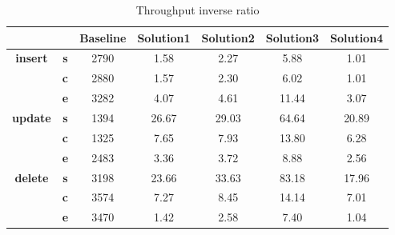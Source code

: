 \begin{table}[h]
\centering
\caption{Throughput inverse ratio}\label{t:}
\begin{tabular}{ccccccc}
\toprule
&&\textbf{Baseline} & \textbf{Solution1} & \textbf{Solution2} & \textbf{Solution3} & \textbf{Solution4}\\
\midrule
\multirow{3}{*}{\textbf{insert}} & \textbf{s} & 2790 & 1.58 & 2.27 & 5.88 & 1.01\\
 & \textbf{c} & 2880 & 1.57 & 2.30 & 6.02 & 1.01\\
 & \textbf{e} & 3282 & 4.07 & 4.61 & 11.44 & 3.07\\
\midrule
\multirow{3}{*}{\textbf{update}} & \textbf{s} & 1394 & 26.67 & 29.03 & 64.64 & 20.89\\
 & \textbf{c} & 1325 & 7.65 & 7.93 & 13.80 & 6.28\\
 & \textbf{e} & 2483 & 3.36 & 3.72 & 8.88 & 2.56\\
\midrule
\multirow{3}{*}{\textbf{delete}} & \textbf{s} & 3198 & 23.66 & 33.63 & 83.18 & 17.96\\
 & \textbf{c} & 3574 & 7.27 & 8.45 & 14.14 & 7.01\\
 & \textbf{e} & 3470 & 1.42 & 2.58 & 7.40 & 1.04\\
\bottomrule
\end{tabular}
\end{table}






